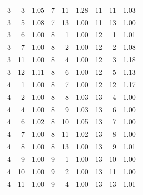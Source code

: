 \begin{table}
\begin{tabular}{|rrl||rrl||rrl|}
 3 & 3 & 1.05 & 7 & 11 & 1.28 & 11 & 11 & 1.03 \\
 3 & 5 & 1.08 & 7 & 13 & 1.00 & 11 & 13 & 1.00 \\
 3 & 6 & 1.00 & 8 & 1 & 1.00 & 12 & 1 & 1.01 \\
 3 & 7 & 1.00 & 8 & 2 & 1.00 & 12 & 2 & 1.08 \\
 3 & 11 & 1.00 & 8 & 4 & 1.00 & 12 & 3 & 1.18 \\
 3 & 12 & 1.11 & 8 & 6 & 1.00 & 12 & 5 & 1.13 \\
 4 & 1 & 1.00 & 8 & 7 & 1.00 & 12 & 12 & 1.17 \\
 4 & 2 & 1.00 & 8 & 8 & 1.03 & 13 & 4 & 1.00 \\
 4 & 4 & 1.00 & 8 & 9 & 1.03 & 13 & 6 & 1.00 \\
 4 & 6 & 1.02 & 8 & 10 & 1.05 & 13 & 7 & 1.00 \\
 4 & 7 & 1.00 & 8 & 11 & 1.02 & 13 & 8 & 1.00 \\
 4 & 8 & 1.00 & 8 & 13 & 1.00 & 13 & 9 & 1.01 \\
 4 & 9 & 1.00 & 9 & 1 & 1.00 & 13 & 10 & 1.00 \\
 4 & 10 & 1.00 & 9 & 2 & 1.00 & 13 & 11 & 1.00 \\
 4 & 11 & 1.00 & 9 & 4 & 1.00 & 13 & 13 & 1.01 \\
 \bottomrule
 \end{tabular}
 \label{tab:sens_2_gelman_rubin}
\end{table}

